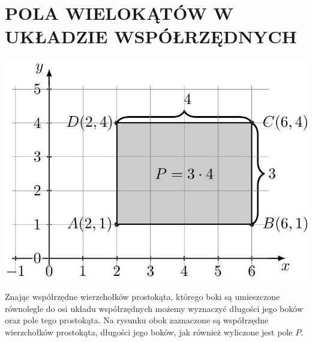 \documentclass[10pt]{article}
\begin{document}
\section*{POLA WIELOKĄTÓW W UKŁADZIE WSPÓŁRZĘDNYCH}
\begin{center}
\includegraphics[max width=\textwidth]{2024_11_21_8f01584889ff06348ae7g-201}
\end{center}

Znając współrzędne wierzchołków prostokąta, którego boki są umieszczone równolegle do osi układu współrzędnych możemy wyznaczyć długości jego boków oraz pole tego prostokąta. Na rysunku obok zaznaczone są współrzędne wierzchołków prostokąta, długości jego boków, jak również wyliczone jest pole \(P\).
\end{document}
